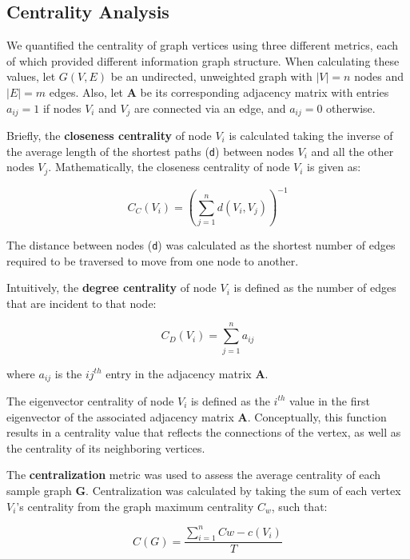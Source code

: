 \documentclass[12pt,]{article}
\begin{document}
\subsection{Centrality Analysis}\label{centrality-analysis}

We quantified the centrality of graph vertices using three different
metrics, each of which provided different information graph structure.
When calculating these values, let \(G(V,E)\) be an undirected,
unweighted graph with \(|V|=n\) nodes and \(|E|=m\) edges. Also, let
\(\mathbf{A}\) be its corresponding adjacency matrix with entries
\(a_{ij} = 1\) if nodes \(V_i\) and \(V_j\) are connected via an edge,
and \(a_{ij} = 0\) otherwise.

Briefly, the \textbf{closeness centrality} of node \(V_i\) is calculated
taking the inverse of the average length of the shortest paths
(\texttt{d}) between nodes \(V_i\) and all the other nodes \(V_j\).
Mathematically, the closeness centrality of node \(V_i\) is given as:

\[ { C }_{ C }\left( { V }_{ i } \right) ={ \left( \sum _{ j=1 }^{ n }{ d\left( { V }_{ i },{ V }_{ j } \right)  }  \right)  }^{ -1 } \]

The distance between nodes (\texttt{d}) was calculated as the shortest
number of edges required to be traversed to move from one node to
another.

Intuitively, the \textbf{degree centrality} of node \(V_i\) is defined
as the number of edges that are incident to that node:

\[ { C }_{ D }\left( { V }_{ i } \right) =\sum _{ j=1 }^{ n }{ { a }_{ ij } } \]

where \(a_{ij}\) is the \(ij^{th}\) entry in the adjacency matrix
\(\mathbf{A}\).

The eigenvector centrality of node \(V_i\) is defined as the \(i^{th}\)
value in the first eigenvector of the associated adjacency matrix
\(\mathbf{A}\). Conceptually, this function results in a centrality
value that reflects the connections of the vertex, as well as the
centrality of its neighboring vertices.

The \textbf{centralization} metric was used to assess the average
centrality of each sample graph \(\mathbf{G}\). Centralization was
calculated by taking the sum of each vertex \(V_{i}\)'s centrality from
the graph maximum centrality \(C_{w}\), such that:

\[ C\left( G \right) =\frac { \sum _{ i=1 }^{ n }{ Cw -c\left( { V }_{ i } \right)  }  }{ { T } }  \]
\end{document}
